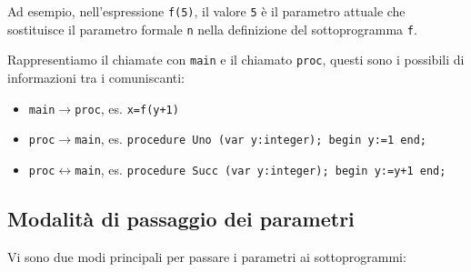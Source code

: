 
Ad esempio, nell'espressione \texttt{f(5)}, il valore \texttt{5} è il parametro attuale che sostituisce il parametro formale \texttt{n} nella definizione del sottoprogramma \texttt{f}.


Rappresentiamo il chiamate con \texttt{main} e il chiamato \texttt{proc}, questi sono i possibili di informazioni tra i comuniscanti:
\begin{itemize}
    \item \texttt{main}$\to$\texttt{proc}, es. \texttt{x=f(y+1)}
    \item \texttt{proc}$\to$\texttt{main}, es. \texttt{procedure Uno (var y:integer); begin y:=1 end;}
    \item \texttt{proc}$\leftrightarrow$\texttt{main}, es. \texttt{procedure Succ (var y:integer); begin y:=y+1 end;}
\end{itemize}



\subsection{Modalità di passaggio dei parametri}
Vi sono due modi principali per passare i parametri ai sottoprogrammi:

